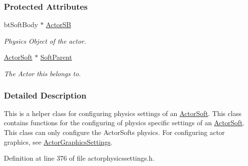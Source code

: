 \subsubsection*{Protected Attributes}
\begin{DoxyCompactItemize}
\item 
\hypertarget{classMezzanine_1_1ActorSoftPhysicsSettings_a44408487d6458ee64320be6d1283c1c0}{
btSoftBody $\ast$ \hyperlink{classMezzanine_1_1ActorSoftPhysicsSettings_a44408487d6458ee64320be6d1283c1c0}{ActorSB}}
\label{classMezzanine_1_1ActorSoftPhysicsSettings_a44408487d6458ee64320be6d1283c1c0}

\begin{DoxyCompactList}\small\item\em Physics Object of the actor. \item\end{DoxyCompactList}\item 
\hypertarget{classMezzanine_1_1ActorSoftPhysicsSettings_aa895658bc511f318b4a31234823d3e5c}{
\hyperlink{classMezzanine_1_1ActorSoft}{ActorSoft} $\ast$ \hyperlink{classMezzanine_1_1ActorSoftPhysicsSettings_aa895658bc511f318b4a31234823d3e5c}{SoftParent}}
\label{classMezzanine_1_1ActorSoftPhysicsSettings_aa895658bc511f318b4a31234823d3e5c}

\begin{DoxyCompactList}\small\item\em The Actor this belongs to. \item\end{DoxyCompactList}\end{DoxyCompactItemize}


\subsubsection{Detailed Description}
This is a helper class for configuring physics settings of an \hyperlink{classMezzanine_1_1ActorSoft}{ActorSoft}. This class contains functions for the configuring of physics specific settings of an \hyperlink{classMezzanine_1_1ActorSoft}{ActorSoft}. This class can only configure the ActorSofts physics. For configuring actor graphics, see \hyperlink{classMezzanine_1_1ActorGraphicsSettings}{ActorGraphicsSettings}. 

Definition at line 376 of file actorphysicssettings.h.



